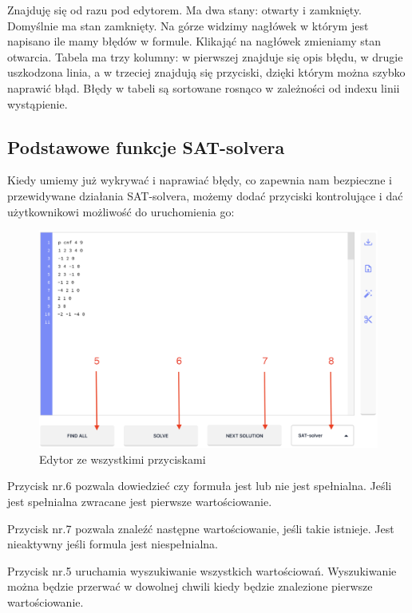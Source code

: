 \documentclass[a4paper,12pt,oneside]{book}
\theoremstyle{definition}
\begin{document}
\noindent Znajduję się od razu pod edytorem. Ma dwa stany: otwarty i zamknięty. Domyślnie ma stan zamknięty. Na górze widzimy nagłówek w którym jest napisano ile mamy błędów w formule. Klikająć na nagłówek zmieniamy stan otwarcia. Tabela ma trzy kolumny: w pierwszej znajduje się opis błędu, w drugie uszkodzona linia, a w trzeciej znajdują się przyciski, dzięki którym można szybko naprawić błąd. Błędy w tabeli są sortowane rosnąco w zależności od indexu linii wystąpienie.

\subsection{Podstawowe funkcje SAT-solvera}

Kiedy umiemy już wykrywać i naprawiać błędy, co zapewnia nam bezpieczne i przewidywane działania SAT-solvera, możemy dodać przyciski kontrolujące i dać użytkownikowi możliwość do uruchomienia go:

\begin{figure}[ht]
    \centering
    \includegraphics[width=14.30cm]{7}
    \caption{Edytor ze wszystkimi przyciskami}
    \label{fig:7}
\end{figure}

Przycisk nr.6 pozwala dowiedzieć czy formuła jest lub nie jest spełnialna. Jeśli jest spełnialna zwracane jest pierwsze wartościowanie.

Przycisk nr.7 pozwala znaleźć następne wartościowanie, jeśli takie istnieje. Jest nieaktywny jeśli formula jest niespełnialna.

Przycisk nr.5 uruchamia wyszukiwanie wszystkich wartościowań. Wyszukiwanie można będzie przerwać w dowolnej chwili kiedy będzie znalezione pierwsze wartościowanie.
\end{document}

